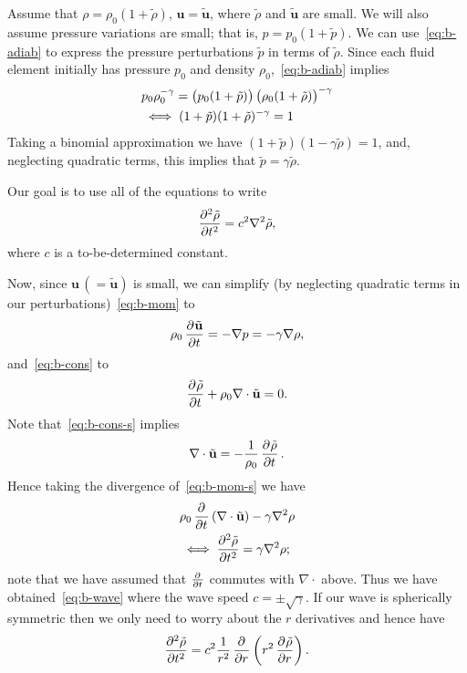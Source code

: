 \documentclass{article}
\def\*#1{\mathbf{#1}}
\def\ti#1{\tilde{#1}}
\begin{document}
Assume that $\rho = \rho_0 (1 + \ti{\rho})$, $\*u = \ti{\*u}$, where
$\ti{\rho}$ and $\ti{\*u}$ are small. We will also assume pressure
variations are small; that is, $p = p_0 (1 + \ti{p})$. We can
use~\eqref{eq:b-adiab} to express the pressure perturbations $\ti{p}$ in
terms of $\ti{\rho}$. Since each fluid element initially has pressure
$p_0$ and density $\rho_0$,~\eqref{eq:b-adiab} implies
%
\begin{align*}
    &p_0 \rho_0^{- \gamma} = \del{p_0 (1 + \ti{p})} \del[1]{\rho_0 (1 + \ti{\rho})}^{- \gamma} \\
    &\iff (1 + \ti{p}) (1 + \ti{\rho})^{-\gamma} = 1
\end{align*}
%
Taking a binomial approximation we have $(1 + \ti{p}) (1 - \gamma
\ti{\rho}) = 1$, and, neglecting quadratic terms, this implies that
$\ti{p} = \gamma \ti{\rho}$.

Our goal is to use all of the equations to write
%
\begin{equation}
    \dpd[2]{\ti{\rho}}{t} = c^2 \nabla^2 \ti{\rho}
    ,
    \label{eq:b-wave}
\end{equation}
%
where $c$ is a to-be-determined constant.

Now, since $\*u \, (= \ti{\*u})$ is small, we can simplify (by
neglecting quadratic terms in our perturbations)~\eqref{eq:b-mom} to
%
\begin{equation}
    \rho_0 \dpd{\ti{\*u}}{t} = - \nabla p = - \gamma \nabla \rho
    ,
    \label{eq:b-mom-s}
\end{equation}
%
and~\eqref{eq:b-cons} to
%
\begin{equation}
    \dpd{\ti{\rho}}{t} + \rho_0 \nabla \cdot \ti{\*u} = 0
    .
    \label{eq:b-cons-s}
\end{equation}
%
Note that~\eqref{eq:b-cons-s} implies
%
\begin{equation}
    \nabla \cdot \ti{\*u} = - \frac{1}{\rho_0} \dpd{\ti{\rho}}{t}
    .
    \label{eq:b-cons-s2}
\end{equation}
%
Hence taking the divergence of~\eqref{eq:b-mom-s} we have
%
\begin{align*}
    &\rho_0 \dpd{}{t} \del{\nabla \cdot \ti{\*u}} - \gamma \nabla^2 \rho \\
    &\iff \dpd[2]{\ti{\rho}}{t} = \gamma \nabla^2 \rho
    ;
\end{align*}
%
note that we have assumed that $\pd{}{t}$ commutes with $\nabla \cdot$
above. Thus we have obtained~\eqref{eq:b-wave} where the wave speed $c =
\pm \sqrt{\gamma}$. If our wave is spherically symmetric then we only
need to worry about the $r$ derivatives and hence have
%
\begin{equation*}
    \dpd[2]{\ti{\rho}}{t} = c^2 \frac{1}{r^2} \dpd{}{r} \del{r^2 \dpd{\ti{\rho}}{r}}
    .
\end{equation*}
\end{document}

